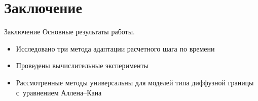 
\section{Заключение}

\begin{frame}{Заключение}
Основные результаты работы.
\begin{itemize}
    \item Исследовано три метода адаптации расчетного шага по времени
    \item Проведены вычислительные эксперименты
    \item Рассмотренные методы универсальны для моделей типа диффузной границы с~уравнением Аллена--Кана
\end{itemize}
\end{frame}